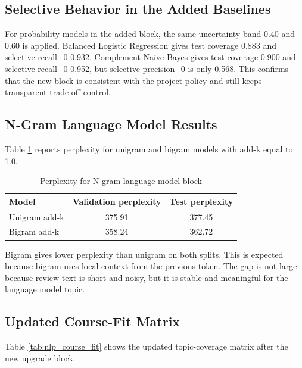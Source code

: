 \documentclass[12pt,a4paper]{article}
\begin{document}
\subsection{Selective Behavior in the Added Baselines}
For probability models in the added block, the same uncertainty band 0.40 and 0.60 is applied. Balanced Logistic Regression gives test coverage 0.883 and selective recall\_0 0.932. Complement Naive Bayes gives test coverage 0.900 and selective recall\_0 0.952, but selective precision\_0 is only 0.568. This confirms that the new block is consistent with the project policy and still keeps transparent trade-off control.

\subsection{N-Gram Language Model Results}
Table \ref{tab:nlp_ngram_results} reports perplexity for unigram and bigram models with add-k equal to 1.0.

\begin{table}[H]
\centering
\caption{Perplexity for N-gram language model block}
\label{tab:nlp_ngram_results}
\begin{tabular}{lcc}
\toprule
Model & Validation perplexity & Test perplexity \\
\midrule
Unigram add-k & 375.91 & 377.45 \\
Bigram add-k & 358.24 & 362.72 \\
\bottomrule
\end{tabular}
\end{table}

Bigram gives lower perplexity than unigram on both splits. This is expected because bigram uses local context from the previous token. The gap is not large because review text is short and noisy, but it is stable and meaningful for the language model topic.

\subsection{Updated Course-Fit Matrix}
Table \ref{tab:nlp_course_fit} shows the updated topic-coverage matrix after the new upgrade block.
\end{document}
